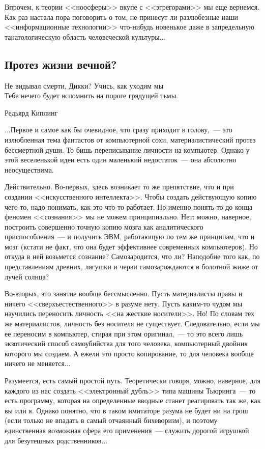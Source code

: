 \documentclass{scrbook}
\makeatletter
\newcommand{\defaultepigraphwidth}{0.5} %
\newcommand{\flqq}{<<}
\newcommand{\frqq}{>>}
\newcommand{\mdash}{~--- }
\newcommand{\commamdash}{~--- } %
\newcommand{\essaysection}[1]{\subsection*{#1}\nopagebreak}
\newcommand{\myepigraph}[3][\@empty]{
	\ifx\@empty#1
		\setlength{\epigraphwidth}{\defaultepigraphwidth\textwidth}
	\else
		\setlength{\epigraphwidth}{#1\textwidth}
	\fi
	\epigraph{#2}{#3}
	\setlength{\epigraphwidth}{\defaultepigraphwidth\textwidth} %
	\nopagebreak
}
\makeatother
\begin{document}
Впрочем, к теории {\flqq}ноосферы{\frqq} вкупе с {\flqq}эгрегорами{\frqq} мы еще вернемся. Как раз настала пора поговорить о том, не принесут ли разлюбезные наши {\flqq}информационные технологии{\frqq} что-нибудь новенькое даже в запредельную танатологическую область человеческой культуры...

\essaysection{Протез жизни вечной?}

\myepigraph{Не видывал смерти, Дикки? Учись, как уходим мы \\
Тебе нечего будет вспомнить на пороге грядущей тьмы.}
{Редьярд Киплинг}

...Первое и самое как бы очевидное, что сразу приходит в голову,{\commamdash}это излюбленная тема фантастов от компьютерной сохи, материалистический протез бессмертной души. То бишь переписывание личности на компьютер. Однако у этой веселенькой идеи есть один маленький недостаток{\mdash}она абсолютно неосуществима.

Действительно. Во-первых, здесь возникает то же препятствие, что и при создании {\flqq}искусственного интеллекта{\frqq}. Чтобы создать действующую копию чего-то, надо понимать, как это что-то работает. Но именно понять-то до конца феномен {\flqq}сознания{\frqq} мы не можем принципиально. Нет: можно, наверное, построить совершенно точную копию мозга как аналитического приспособления{\mdash}и получить ЭВМ, работающую по тем же принципам, что и мозг (кстати не факт, что она будет эффективнее современных компьютеров). Но откуда в ней возьмется сознание? Самозародится, что ли? Наподобие того как, по представлениям древних, лягушки и черви самозарождаются в болотной жиже от лучей солнца?

Во-вторых, это занятие вообще бессмысленно. Пусть материалисты правы и ничего {\flqq}сверхъестественного{\frqq} в разуме нету. Пусть каким-то чудом мы научились переносить личность {\flqq}на жесткие носители{\frqq}. Но! По словам тех же материалистов, личность без носителя не существует. Следовательно, если мы ее переносим в компьютер, стирая при этом оригинал,{\commamdash}то это всего лишь экзотический способ самоубийства для того человека, компьютерный двойник которого мы создаем. А ежели это просто копирование, то для человека вообще ничего не меняется...

Разумеется, есть самый простой путь. Теоретически говоря, можно, наверное, для каждого из нас создать {\flqq}электронный дубль{\frqq} типа машины Тьюринга{\mdash}то есть программу, которая на определенные вводные станет реагировать так же, как вы или я. Однако понятно, что в таком имитаторе разума не будет ни на грош (если только не впадать в самый отчаянный бихеворизм), и поэтому единственная возможная сфера его применения{\mdash}служить дорогой игрушкой для безутешных родственников...
\end{document}

